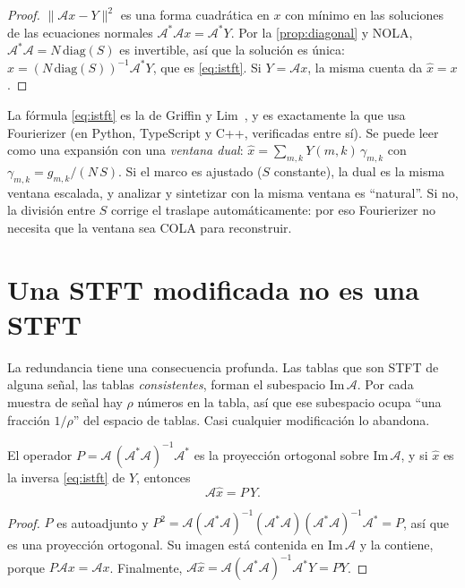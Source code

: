 \begin{proof}
$\|\mathcal Ax-Y\|^2$ es una forma cuadrática en $x$ con mínimo en las soluciones de las
ecuaciones normales $\mathcal A^{*}\mathcal Ax=\mathcal A^{*}Y$. Por la
\cref{prop:diagonal} y NOLA, $\mathcal A^{*}\mathcal A=N\,\mathrm{diag}(S)$ es invertible, así que la
solución es única: $\hat x=(N\,\mathrm{diag}(S))^{-1}\mathcal A^{*}Y$, que es \eqref{eq:istft}.
Si $Y=\mathcal Ax$, la misma cuenta da $\hat x=x$.
\end{proof}

La fórmula \eqref{eq:istft} es la de Griffin y Lim~\cite{griffinlim1984}, y es exactamente la que
usa Fourierizer (en Python, TypeScript y C++, verificadas entre sí). Se puede leer como una
expansión con una \emph{ventana dual}: $\hat x=\sum_{m,k}Y(m,k)\,\gamma_{m,k}$ con
$\gamma_{m,k}=g_{m,k}/(N\,S)$. Si el marco es ajustado ($S$ constante), la dual es la misma
ventana escalada, y analizar y sintetizar con la misma ventana es ``natural''. Si no, la división
entre $S$ corrige el traslape automáticamente: por eso Fourierizer no necesita que la ventana sea
COLA para reconstruir.

\section{Una STFT modificada no es una STFT}

La redundancia tiene una consecuencia profunda. Las tablas que son STFT de alguna señal, las
tablas \emph{consistentes}, forman el subespacio $\mathrm{Im}\,\mathcal A$. Por cada muestra de
señal hay $\rho$ números en la tabla, así que ese subespacio ocupa ``una fracción $1/\rho$'' del
espacio de tablas. Casi cualquier modificación lo abandona.

\begin{proposicion}\label{prop:proyeccion}
El operador $P=\mathcal A\,(\mathcal A^{*}\mathcal A)^{-1}\mathcal A^{*}$ es la proyección ortogonal
sobre $\mathrm{Im}\,\mathcal A$, y si $\hat x$ es la inversa \eqref{eq:istft} de $Y$, entonces
\[
  \mathcal A\hat x=P\,Y .
\]
\end{proposicion}

\begin{proof}
$P$ es autoadjunto y $P^2=\mathcal A(\mathcal A^{*}\mathcal A)^{-1}(\mathcal A^{*}\mathcal A)(\mathcal A^{*}\mathcal A)^{-1}\mathcal A^{*}=P$,
así que es una proyección ortogonal. Su imagen está contenida en $\mathrm{Im}\,\mathcal A$ y la
contiene, porque $P\mathcal Ax=\mathcal Ax$. Finalmente,
$\mathcal A\hat x=\mathcal A(\mathcal A^{*}\mathcal A)^{-1}\mathcal A^{*}Y=PY$.
\end{proof}

